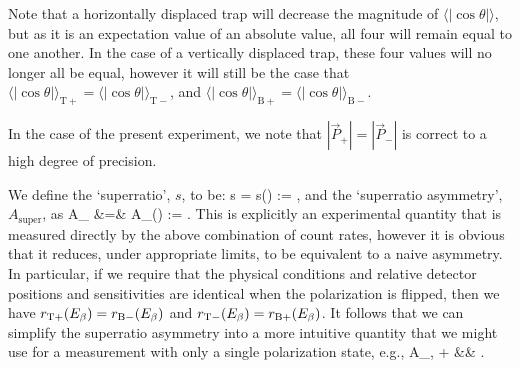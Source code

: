  Note that a horizontally displaced trap will decrease the magnitude of $\langle | \cos\theta | \rangle $, but as it is an expectation value of an absolute value, all four will remain equal to one another.  In the case of a vertically displaced trap, these four values will no longer all be equal, however it will still be the case that $\langle | \cos\theta | \rangle_{\mathrm T +} = \langle | \cos\theta | \rangle_{\mathrm T -}$, and $\langle | \cos\theta | \rangle_{\mathrm B+} = \langle | \cos\theta | \rangle_{\mathrm B -}$.  

In the case of the present experiment, we note that $|\vec{P}_+| = |\vec{P}_-|$ is correct to a high degree of precision.

We define the `superratio', $s$, to be:
\bea
s \;\;=\;\; s(\Ebeta) \;\;:=\;\; , 
\eea
and the `superratio asymmetry', $A_{\mathrm{super}}$, as
\bea
A_{} &=& A_{}(\Ebeta) \;\;:=\;\; .
\eea
This is explicitly an experimental quantity that is measured directly by the above combination of count rates, however it is obvious that it reduces, under appropriate limits, to be equivalent to a naive asymmetry.  In particular, if we require that the physical conditions and relative detector positions and sensitivities are identical when the polarization is flipped, then we have $r_{\mathrm T+}(E_{\beta}) = r_{\mathrm B-}(E_{\beta})$ and $r_{\mathrm T-}(E_{\beta}) = r_{\mathrm B+}(E_{\beta})$.
It follows that we can simplify the superratio asymmetry into a more intuitive quantity that we might use for a measurement with only a single polarization state, e.g.,  
\bea
A_{, +} &\rightarrow& . 
\label{eq:singlepol_asymmetry}
\eea

